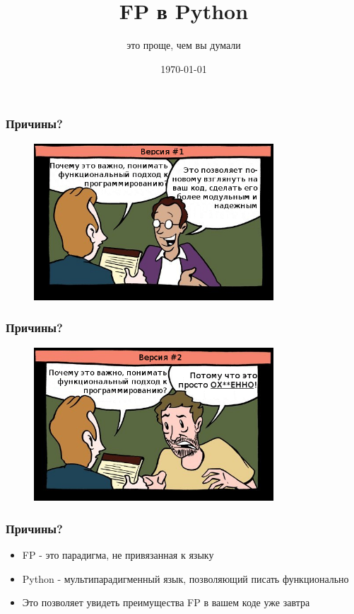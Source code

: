 \documentclass[14pt, compress, aspectratio=169]{beamer}
\title{FP в Python}
\subtitle{это проще, чем вы думали}
\date{\today}
\institute{}
\begin{document}
\maketitle

\section{}

\begin{frame}
    \frametitle{Причины?}
    \vspace{-35pt}
    \begin{figure}
        \includegraphics[width=0.8\textwidth,center]{first_option.png}
    \end{figure}
\end{frame}

\begin{frame}
    \frametitle{Причины?}
    \vspace{-35pt}
    \begin{figure}
        \includegraphics[width=0.8\textwidth,center]{second_option.png}
    \end{figure}
\end{frame}

\begin{frame}[fragile]
    \frametitle{Причины?}
    \begin{itemize}[label={\MVRightarrow}]
        \item FP - это парадигма, не привязанная к языку
        \item Python - мультипарадигменный язык, позволяющий писать функционально
        \item Это позволяет увидеть преимущества FP в вашем коде уже завтра
    \end{itemize}
\end{frame}
\end{document}
